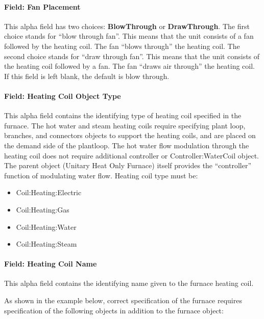 \paragraph{Field: Fan Placement}\label{field-fan-placement-4}

This alpha field has two choices: \textbf{BlowThrough} or \textbf{DrawThrough}. The first choice stands for ``blow through fan''. This means that the unit consists of a fan followed by the heating coil. The fan ``blows through'' the heating coil. The second choice stands for ``draw through fan''. This means that the unit consists of the heating coil followed by a fan. The fan ``draws air through'' the heating coil. If this field is left blank, the default is blow through.

\paragraph{Field: Heating Coil Object Type}\label{field-heating-coil-object-type-5}

This alpha field contains the identifying type of heating coil specified in the furnace. The hot water and steam heating coils require specifying plant loop, branches, and connectors objects to support the heating coils, and are placed on the demand side of the plantloop. The hot water flow modulation through the heating coil does not require additional controller or Controller:WaterCoil object. The parent object (Unitary Heat Only Furnace) itself provides the ``controller'' function of modulating water flow. Heating coil type must be:

\begin{itemize}
\item
  Coil:Heating:Electric
\item
  Coil:Heating:Gas
\item
  Coil:Heating:Water
\item
  Coil:Heating:Steam
\end{itemize}

\paragraph{Field: Heating Coil Name}\label{field-heating-coil-name-5}

This alpha field contains the identifying name given to the furnace heating coil.

As shown in the example below, correct specification of the furnace requires specification of the following objects in addition to the furnace object:

